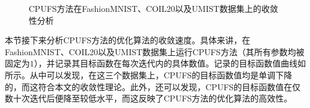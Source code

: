 \begin{figure}[!t]
    \centering
    \caption{CPUFS方法在FashionMNIST、COIL20以及UMIST数据集上的收敛性分析}
    \label{fig:converge}
\end{figure}

本节接下来分析CPUFS方法的优化算法的收敛速度。具体来讲，在FashionMNIST、COIL20以及UMIST数据集上运行CPUFS方法（其所有参数均被固定为$1$），并记录其目标函数在每次迭代内的具体数值。记录的目标函数值曲线如所示。从中可以发现，在这三个数据集上，CPUFS的目标函数值均是单调下降的，而这符合本文的收敛性理论。此外，还可以发现，CPUFS的目标函数值在仅数十次迭代后便降至较低水平，而这反映了CPUFS方法的优化算法的高效性。

